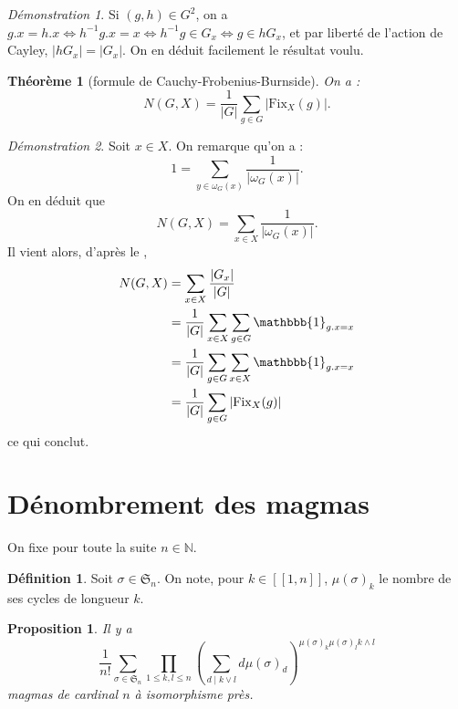 \documentclass{article}
\newtheorem*{theoreme}{Théorème}
\newtheorem*{proposition}{Proposition}
\theoremstyle{definition}
\newtheorem*{definition}{Définition}
\theoremstyle{remark}
\newtheorem*{demonstration}{Démonstration}
\begin{document}
\begin{demonstration}
    Si $(g,h)\in G^2$, on a $g.x=h.x\Leftrightarrow h^{-1}g.x=x\Leftrightarrow h^{-1}g\in G_x\Leftrightarrow g\in hG_x$, et par liberté de l'action de Cayley, $|hG_x|=|G_x|$. On en déduit facilement le résultat voulu.
\end{demonstration}

\begin{theoreme}[formule de Cauchy-Frobenius-Burnside]
    On a :
    $$N(G,X)=\frac{1}{|G|}\sum_{g\in G}|\mathrm{Fix}_X(g)|.$$
\end{theoreme}

\begin{demonstration}
    Soit $x\in X$. On remarque qu'on a :
    $$1=\sum_{y\in\omega_G(x)}\frac{1}{|\omega_G(x)|}.$$
    On en déduit que
    $$N(G,X)=\sum_{x\in X}\frac{1}{|\omega_G(x)|}.$$
    Il vient alors, d'après le ,
    \begin{align*}
        N(G,X)&=\sum_{x\in X}\frac{|G_x|}{|G|}\\
        &=\frac1{|G|}\sum_{x\in X}\sum_{g\in G}\mathbbb{1}_{g.x=x}\\
        &=\frac1{|G|}\sum_{g\in G}\sum_{x\in X}\mathbbb{1}_{g.x=x}\\
        &=\frac{1}{|G|}\sum_{g\in G}|\mathrm{Fix}_X(g)|
    \end{align*}
    ce qui conclut.
\end{demonstration}

\section{Dénombrement des magmas}

On fixe pour toute la suite $n\in\mathbb N$.

\begin{definition}
    Soit $\sigma\in\mathfrak S_n$. On note, pour $k\in[\![1,n]\!]$, $\mu(\sigma)_k$ le nombre de ses cycles de longueur $k$.
\end{definition}

\begin{proposition}
Il y a
$$\frac{1}{n!}\sum_{\sigma\in\mathfrak S_n}\prod_{1\leq k,l\leq n}\left(\sum_{d\mid k\lor l}d\mu(\sigma)_d\right)^{\mu(\sigma)_k\mu(\sigma)_lk\land l}$$
magmas de cardinal $n$ à isomorphisme près.
\end{proposition}
\end{document}
